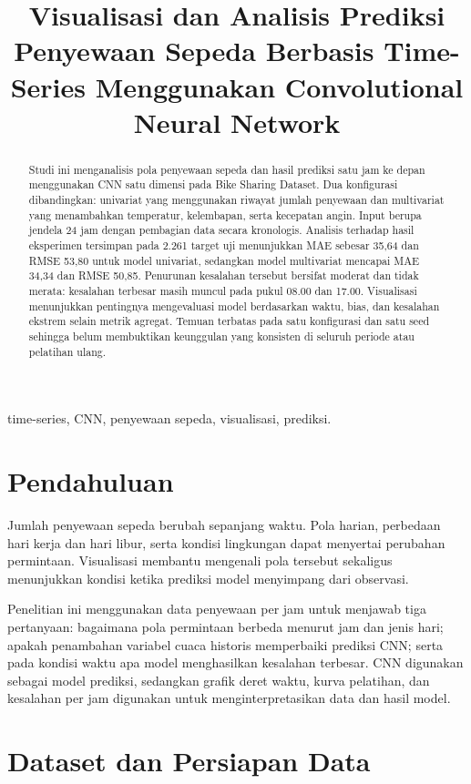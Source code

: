 \documentclass[10pt,conference]{IEEEtran}
\title{Visualisasi dan Analisis Prediksi Penyewaan Sepeda Berbasis Time-Series Menggunakan Convolutional Neural Network}
\author{\IEEEauthorblockN{Nathanael Gunawan (13524066) dan [Nama Rekan -- NIM]}
\IEEEauthorblockA{Program Studi Teknik Informatika\\Sekolah Teknik Elektro dan Informatika, Institut Teknologi Bandung}}
\begin{document}
\maketitle
\begin{abstract}
Studi ini menganalisis pola penyewaan sepeda dan hasil prediksi satu jam ke depan menggunakan CNN satu dimensi pada Bike Sharing Dataset. Dua konfigurasi dibandingkan: univariat yang menggunakan riwayat jumlah penyewaan dan multivariat yang menambahkan temperatur, kelembapan, serta kecepatan angin. Input berupa jendela 24 jam dengan pembagian data secara kronologis. Analisis terhadap hasil eksperimen tersimpan pada 2.261 target uji menunjukkan MAE sebesar 35,64 dan RMSE 53,80 untuk model univariat, sedangkan model multivariat mencapai MAE 34,34 dan RMSE 50,85. Penurunan kesalahan tersebut bersifat moderat dan tidak merata: kesalahan terbesar masih muncul pada pukul 08.00 dan 17.00. Visualisasi menunjukkan pentingnya mengevaluasi model berdasarkan waktu, bias, dan kesalahan ekstrem selain metrik agregat. Temuan terbatas pada satu konfigurasi dan satu seed sehingga belum membuktikan keunggulan yang konsisten di seluruh periode atau pelatihan ulang.
\end{abstract}
\begin{IEEEkeywords}
time-series, CNN, penyewaan sepeda, visualisasi, prediksi.
\end{IEEEkeywords}

\section{Pendahuluan}
Jumlah penyewaan sepeda berubah sepanjang waktu. Pola harian, perbedaan hari kerja dan hari libur, serta kondisi lingkungan dapat menyertai perubahan permintaan. Visualisasi membantu mengenali pola tersebut sekaligus menunjukkan kondisi ketika prediksi model menyimpang dari observasi.

Penelitian ini menggunakan data penyewaan per jam untuk menjawab tiga pertanyaan: bagaimana pola permintaan berbeda menurut jam dan jenis hari; apakah penambahan variabel cuaca historis memperbaiki prediksi CNN; serta pada kondisi waktu apa model menghasilkan kesalahan terbesar. CNN digunakan sebagai model prediksi, sedangkan grafik deret waktu, kurva pelatihan, dan kesalahan per jam digunakan untuk menginterpretasikan data dan hasil model.

\section{Dataset dan Persiapan Data}
\end{document}
